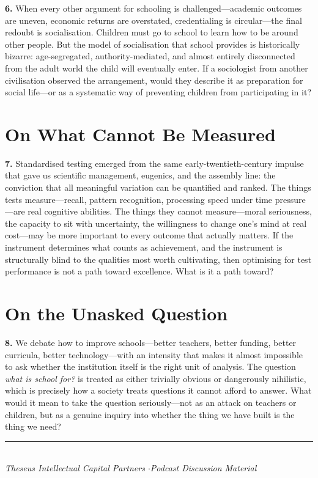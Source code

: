 \documentclass[11pt,letterpaper]{article}
\begin{document}
\textbf{6.}
When every other argument for schooling is challenged---academic outcomes are uneven, economic returns are overstated, credentialing is circular---the final redoubt is socialisation. Children must go to school to learn how to be around other people. But the model of socialisation that school provides is historically bizarre: age-segregated, authority-mediated, and almost entirely disconnected from the adult world the child will eventually enter. If a sociologist from another civilisation observed the arrangement, would they describe it as preparation for social life---or as a systematic way of preventing children from participating in it?

\section{On What Cannot Be Measured}

\textbf{7.}
Standardised testing emerged from the same early-twentieth-century impulse that gave us scientific management, eugenics, and the assembly line: the conviction that all meaningful variation can be quantified and ranked. The things tests measure---recall, pattern recognition, processing speed under time pressure---are real cognitive abilities. The things they cannot measure---moral seriousness, the capacity to sit with uncertainty, the willingness to change one's mind at real cost---may be more important to every outcome that actually matters. If the instrument determines what counts as achievement, and the instrument is structurally blind to the qualities most worth cultivating, then optimising for test performance is not a path toward excellence. What is it a path toward?

\section{On the Unasked Question}

\textbf{8.}
We debate how to improve schools---better teachers, better funding, better curricula, better technology---with an intensity that makes it almost impossible to ask whether the institution itself is the right unit of analysis. The question \textit{what is school for?} is treated as either trivially obvious or dangerously nihilistic, which is precisely how a society treats questions it cannot afford to answer. What would it mean to take the question seriously---not as an attack on teachers or children, but as a genuine inquiry into whether the thing we have built is the thing we need?

\vspace{2em}
\begin{center}
\rule{3cm}{0.4pt}\\[1em]
{\small\textit{Theseus Intellectual Capital Partners \quad$\cdot$\quad Podcast Discussion Material}}
\end{center}
\end{document}
